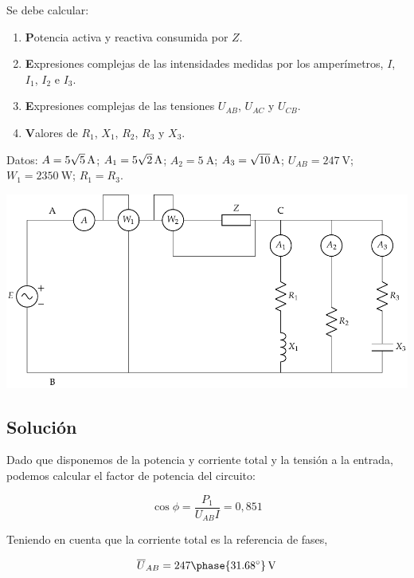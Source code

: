 Se debe calcular:

\begin{enumerate}

\item \textbf Potencia activa y reactiva consumida por $Z$.

\item  \textbf Expresiones complejas de las intensidades medidas por los
  amperímetros, $I$, $I_1$, $I_2$ e $I_3$. 

\item  \textbf Expresiones complejas de las tensiones $U_{AB}$, $U_{AC}$ y
  $U_{CB}$.

\item  \textbf Valores de $R_1$, $X_1$, $R_2$, $R_3$ y $X_3$.

\end{enumerate}

Datos: $A = \qty[parse-numbers = false]{5\sqrt{5}}{\ampere}$; $A_1 = \qty[parse-numbers = false]{5\sqrt{2}}{\ampere}$; $A_2 = \qty{5}{\ampere}$;  $A_3 = \qty[parse-numbers = false]{\sqrt{10}}{\ampere}$;  $U_{AB} = \qty{247}{\volt}$;  $W_1 = \qty{2350}{\watt}$;
$R_1 = R_3$.

\begin{center}
  \includegraphics[width=0.8\linewidth]{figuras/BT2_17.pdf}
\end{center}


\subsection*{Solución}

Dado que disponemos de la potencia y corriente total y la tensión a
la entrada, podemos calcular el factor de potencia del circuito:

\[
\cos \phi = \frac{P_1}{U_{AB} I} = 0,851
\]

Teniendo en cuenta que la corriente total es la referencia de fases, 

\[
\overline{U}_{AB} = \qty[parse-numbers=false]{247 \phase{\ang{31.68}}}{\V}
\]

